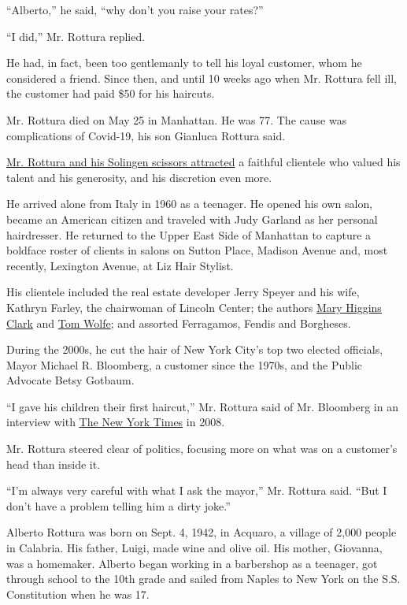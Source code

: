 ``Alberto,'' he said, ``why don't you raise your rates?''

``I did,'' Mr. Rottura replied.

He had, in fact, been too gentlemanly to tell his loyal customer, whom
he considered a friend. Since then, and until 10 weeks ago when Mr.
Rottura fell ill, the customer had paid \$50 for his haircuts.

Mr. Rottura died on May 25 in Manhattan. He was 77. The cause was
complications of Covid-19, his son Gianluca Rottura said.

\href{https://www.nytimes3xbfgragh.onion/2008/11/01/nyregion/01hairdresser.html}{Mr.
Rottura and his Solingen scissors attracted} a faithful clientele who
valued his talent and his generosity, and his discretion even more.

He arrived alone from Italy in 1960 as a teenager. He opened his own
salon, became an American citizen and traveled with Judy Garland as her
personal hairdresser. He returned to the Upper East Side of Manhattan to
capture a boldface roster of clients in salons on Sutton Place, Madison
Avenue and, most recently, Lexington Avenue, at Liz Hair Stylist.

His clientele included the real estate developer Jerry Speyer and his
wife, Kathryn Farley, the chairwoman of Lincoln Center; the authors
\href{https://www.nytimes3xbfgragh.onion/2020/01/31/books/mary-higgins-clark-dead.html}{Mary
Higgins Clark} and
\href{https://www.nytimes3xbfgragh.onion/2018/05/15/obituaries/tom-wolfe-pyrotechnic-nonfiction-writer-and-novelist-dies-at-88.html}{Tom
Wolfe}; and assorted Ferragamos, Fendis and Borgheses.

During the 2000s, he cut the hair of New York City's top two elected
officials, Mayor Michael R. Bloomberg, a customer since the 1970s, and
the Public Advocate Betsy Gotbaum.

``I gave his children their first haircut,'' Mr. Rottura said of Mr.
Bloomberg in an interview with
\href{https://www.nytimes3xbfgragh.onion/2008/11/01/nyregion/01hairdresser.html}{The
New York Times} in 2008.

Mr. Rottura steered clear of politics, focusing more on what was on a
customer's head than inside it.

``I'm always very careful with what I ask the mayor,'' Mr. Rottura said.
``But I don't have a problem telling him a dirty joke.''

Alberto Rottura was born on Sept. 4, 1942, in Acquaro, a village of
2,000 people in Calabria. His father, Luigi, made wine and olive oil.
His mother, Giovanna, was a homemaker. Alberto began working in a
barbershop as a teenager, got through school to the 10th grade and
sailed from Naples to New York on the S.S. Constitution when he was 17.

